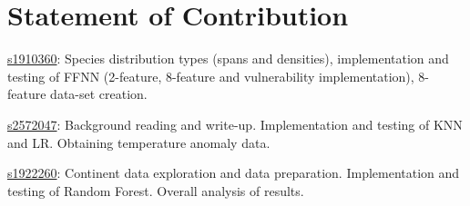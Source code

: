 \section*{Statement of Contribution}
\underline{s1910360}: Species distribution types (spans and densities), implementation and testing of FFNN (2-feature, 8-feature and vulnerability implementation), 8-feature data-set creation.

\underline{s2572047}: Background reading and write-up. Implementation and testing of KNN and LR. Obtaining temperature anomaly data.

\underline{s1922260}: Continent data exploration and data preparation. Implementation and testing of Random Forest. Overall analysis of results. 
